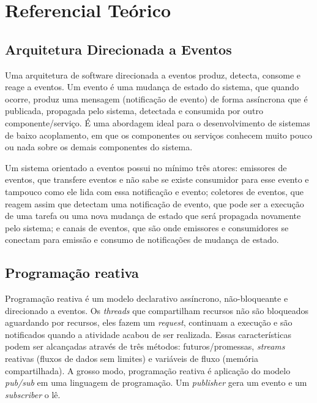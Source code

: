 \documentclass[12pt]{article}
\begin{document}
\section{Referencial Teórico}
\subsection{Arquitetura Direcionada a Eventos}
Uma arquitetura de software direcionada a eventos produz, detecta, consome e reage a eventos. Um evento é uma mudança de estado do sistema, que quando ocorre, produz uma mensagem (notificação de evento) de forma assíncrona que é publicada, propagada pelo sistema, detectada e consumida por outro componente/serviço. É uma abordagem ideal para o desenvolvimento de sistemas de baixo acoplamento, em que os componentes ou serviços conhecem muito pouco ou nada sobre os demais componentes do sistema.

Um sistema orientado a eventos possui no mínimo três atores: emissores de eventos, que transfere eventos e não sabe se existe consumidor para esse evento e tampouco como ele lida com essa notificação e evento; coletores de eventos, que reagem assim que detectam uma notificação de evento, que pode ser a execução de uma tarefa ou uma nova mudança de estado que será propagada novamente pelo sistema; e canais de eventos, que são onde emissores e consumidores se conectam para emissão e consumo de notificações de mudança de estado.

\subsection{Programação reativa}
Programação reativa é um modelo declarativo assíncrono, não-bloqueante e direcionado a eventos. Os \textit{threads} que compartilham recursos não são bloqueados aguardando por recursos, eles fazem um \textit{request}, continuam a execução e são notificados quando a atividade acabou de ser realizada. Essas características podem ser alcançadas através de três métodos: futuros/promessas, \textit{streams} reativas (fluxos de dados sem limites) e variáveis de fluxo (memória compartilhada). A grosso modo, programação reativa é aplicação do modelo \textit{pub/sub} em uma linguagem de programação. Um \textit{publisher} gera um evento e um \textit{subscriber} o lê.
\end{document}
